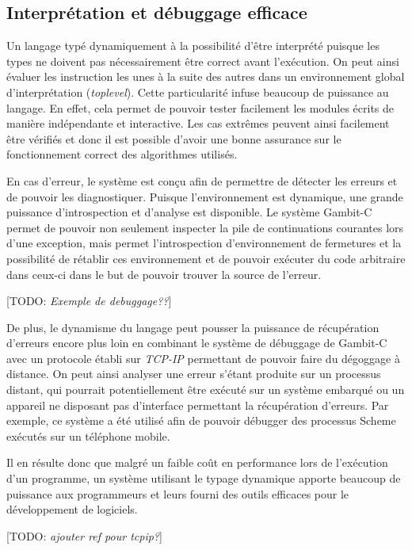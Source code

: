 \documentclass[12pt,oneside,letterpaper,francais]{book}
\newcommand{\todo}[1]{[TODO: {\it #1}]}
\begin{document}
\subsection{Interprétation et débuggage efficace}

Un langage typé dynamiquement à la possibilité d'être interprété
puisque les types ne doivent pas nécessairement être correct avant
l'exécution. On peut ainsi évaluer les instruction les unes à la suite
des autres dans un environnement global d'interprétation
(\textit{toplevel}). Cette particularité infuse beaucoup de puissance
au langage. En effet, cela permet de pouvoir tester facilement les
modules écrits de manière indépendante et interactive. Les cas
extrêmes peuvent ainsi facilement être vérifiés et donc il est
possible d'avoir une bonne assurance sur le fonctionnement correct des
algorithmes utilisés.

En cas d'erreur, le système est conçu afin de permettre de détecter
les erreurs et de pouvoir les diagnostiquer. Puisque l'environnement
est dynamique, une grande puissance d'introspection et d'analyse est
disponible. Le système Gambit-C permet de pouvoir non seulement
inspecter la pile de continuations courantes lors d'une exception,
mais permet l'introspection d'environnement de fermetures et la
possibilité de rétablir ces environnement et de pouvoir exécuter du
code arbitraire dans ceux-ci dans le but de pouvoir trouver la source
de l'erreur.

\todo{Exemple de debuggage??}

De plus, le dynamisme du langage peut pousser la puissance de
récupération d'erreurs encore plus loin en combinant le système de
débuggage de Gambit-C avec un protocole établi sur \textit{TCP-IP}
permettant de pouvoir faire du dégoggage à distance. On peut ainsi
analyser une erreur s'étant produite sur un processus distant, qui
pourrait potentiellement être exécuté sur un système embarqué ou un
appareil ne disposant pas d'interface permettant la récupération
d'erreurs. Par exemple, ce système a été utilisé afin de pouvoir
débugger des processus Scheme exécutés sur un téléphone mobile.

Il en résulte donc que malgré un faible coût en performance lors de
l'exécution d'un programme, un système utilisant le typage dynamique
apporte beaucoup de puissance aux programmeurs et leurs fourni des
outils efficaces pour le développement de logiciels.

\todo{ajouter ref pour tcpip?}
\end{document}
